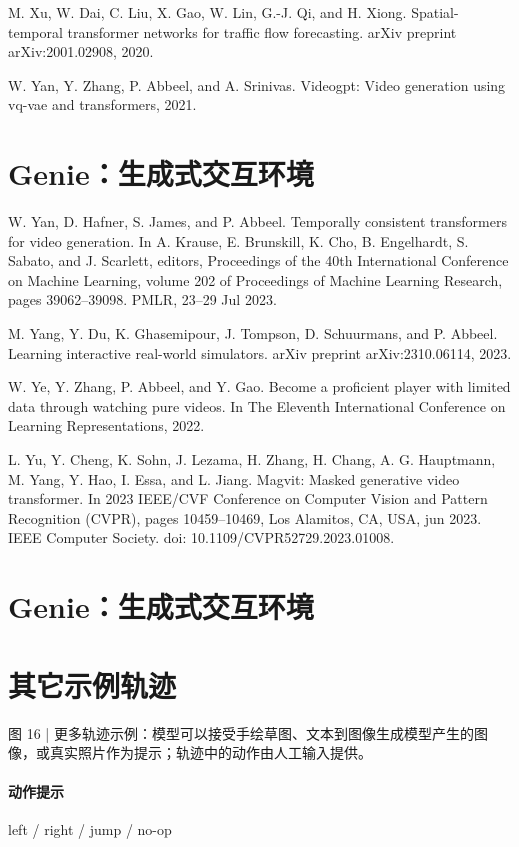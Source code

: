 \documentclass[10pt]{article}
\begin{document}
M. Xu, W. Dai, C. Liu, X. Gao, W. Lin, G.-J. Qi, and H. Xiong. Spatial-temporal transformer networks for traffic flow forecasting. arXiv preprint arXiv:2001.02908, 2020.

W. Yan, Y. Zhang, P. Abbeel, and A. Srinivas. Videogpt: Video generation using vq-vae and transformers, 2021.

\section*{Genie：生成式交互环境}
W. Yan, D. Hafner, S. James, and P. Abbeel. Temporally consistent transformers for video generation. In A. Krause, E. Brunskill, K. Cho, B. Engelhardt, S. Sabato, and J. Scarlett, editors, Proceedings of the 40th International Conference on Machine Learning, volume 202 of Proceedings of Machine Learning Research, pages 39062–39098. PMLR, 23–29 Jul 2023.

M. Yang, Y. Du, K. Ghasemipour, J. Tompson, D. Schuurmans, and P. Abbeel. Learning interactive real-world simulators. arXiv preprint arXiv:2310.06114, 2023.

W. Ye, Y. Zhang, P. Abbeel, and Y. Gao. Become a proficient player with limited data through watching pure videos. In The Eleventh International Conference on Learning Representations, 2022.

L. Yu, Y. Cheng, K. Sohn, J. Lezama, H. Zhang, H. Chang, A. G. Hauptmann, M. Yang, Y. Hao, I. Essa, and L. Jiang. Magvit: Masked generative video transformer. In 2023 IEEE/CVF Conference on Computer Vision and Pattern Recognition (CVPR), pages 10459–10469, Los Alamitos, CA, USA, jun 2023. IEEE Computer Society. doi: 10.1109/CVPR52729.2023.01008.

\section*{Genie：生成式交互环境}
\section*{其它示例轨迹}

图 16 | 更多轨迹示例：模型可以接受手绘草图、文本到图像生成模型产生的图像，或真实照片作为提示；轨迹中的动作由人工输入提供。

\paragraph{动作提示} left / right / jump / no-op
\end{document}
